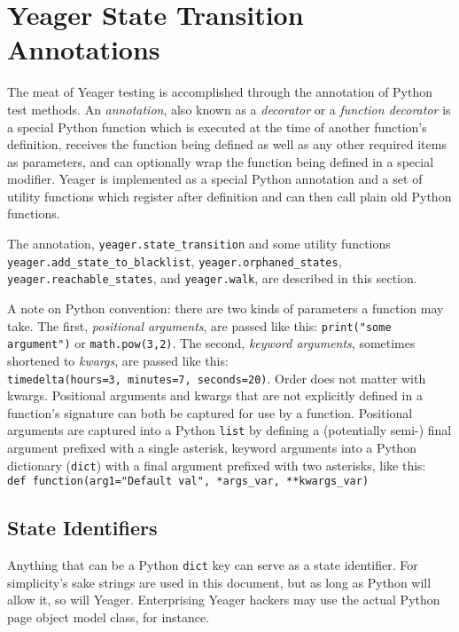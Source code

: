 \section{Yeager State Transition Annotations}
The meat of Yeager testing is accomplished through the annotation of Python test methods. An \textit{annotation}, also known as a \textit{decorator} or a \textit{function decorator} is a special Python function which is executed at the time of another function's definition, receives the function being defined as well as any other required items as parameters, and can optionally wrap the function being defined in a special modifier. Yeager is implemented as a special Python annotation and a set of utility functions which register after definition and can then call plain old Python functions.

The annotation, \texttt{yeager.state\_transition} and some utility functions \\\texttt{yeager.add\_state\_to\_blacklist}, \texttt{yeager.orphaned\_states}, \\\texttt{yeager.reachable\_states}, and \texttt{yeager.walk}, are described in this section.

A note on Python convention: there are two kinds of parameters a function may take. The first, \textit{positional arguments}, are passed like this: \texttt{print("some argument")} or \texttt{math.pow(3,2)}. The second, \textit{keyword arguments}, sometimes shortened to \textit{kwargs}, are passed like this:
\\\texttt{timedelta(hours=3, minutes=7, seconds=20)}. Order does not matter with kwargs. Positional arguments and kwargs that are not explicitly defined in a function's signature can both be captured for use by a function. Positional arguments are captured into a Python \texttt{list} by defining a (potentially semi-) final argument prefixed with a single asterisk, keyword arguments into a Python dictionary (\texttt{dict}) with a final argument prefixed with two asterisks, like this:
\\\texttt{def function(arg1="Default val", *args\_var, **kwargs\_var)}

\subsection{State Identifiers}
Anything that can be a Python \texttt{dict} key can serve as a state identifier. For simplicity's sake strings are used in this document, but as long as Python will allow it, so will Yeager. Enterprising Yeager hackers may use the actual Python page object model class, for instance.

